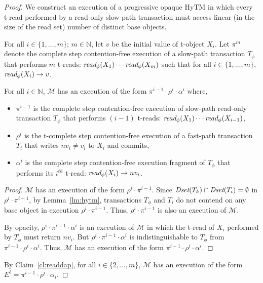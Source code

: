 %
\begin{proof}
We construct an execution of a progressive opaque HyTM in which every t-read performed by a read-only slow-path transaction
must access linear (in the size of the read set) number of distinct base objects.

For all $i\in \{1,\ldots , m\}$; $m \in \mathbb{N}$, let 
$v$ be the initial value of t-object $X_i$.
Let $\pi^{m}$ denote the complete step contention-free execution of a slow-path transaction
$T_{\phi}$ that performs ${m}$ t-reads: $\textit{read}_{\phi}(X_1)\cdots \textit{read}_{\phi}(X_{m})$
such that for all $i\in \{1,\ldots , m \}$, $\textit{read}_{\phi}(X_i) \rightarrow v$.
%
\begin{claim}
\label{cl:readdap}
For all $i\in \mathbb{N}$, $\mathcal{M}$ has an execution of the form $\pi^{i-1}\cdot \rho^i\cdot \alpha^i$ where,
%
\begin{itemize}
\item
$\pi^{i-1}$ is the complete step contention-free execution of slow-path read-only transaction $T_{\phi}$ that performs
$(i-1)$ t-reads: $\textit{read}_{\phi}(X_1)\cdots \textit{read}_{\phi}(X_{i-1})$,
\item
$\rho^i$ is the t-complete step contention-free execution of a fast-path transaction $T_{i}$
that writes $nv_i\neq v_i$ to $X_i$ and commits,
\item
$\alpha^i$ is the complete step contention-free execution fragment of $T_{\phi}$ that performs its $i^{th}$ t-read:
$\textit{read}_{\phi}(X_i) \rightarrow nv_i$.
\end{itemize}
%
\end{claim}
%
\begin{proof}
%
$\mathcal{M}$ has an execution of the form $\rho^i\cdot \pi^{i-1}$.
Since $\textit{Dset}(T_k) \cap \textit{Dset}(T_{i}) =\emptyset$ in $\rho^i\cdot \pi^{i-1}$,
by Lemma~\ref{lm:hytm}, transactions $T_{\phi}$ and $T_i$ do not contend
on any base object in execution $\rho^i\cdot \pi^{i-1}$.
Thus, $\rho^i\cdot \pi^{i-1}$ is also an execution of $\mathcal{M}$.

By opacity, $\rho^i\cdot \pi^{i-1} \cdot \alpha^i$ is an execution
of $\mathcal{M}$ in which the t-read of $X_i$ performed by $T_{\phi}$ must return $nv_i$.
But $\rho^i \cdot \pi^{i-1} \cdot \alpha^i$ is indistinguishable to $T_{\phi}$ from
$\pi^{i-1}\cdot \rho^i \cdot \alpha^i$.
Thus, $\mathcal{M}$ has an execution of the form $\pi^{i-1}\cdot \rho^i \cdot \alpha^i$.
\end{proof}
%
By Claim~\ref{cl:readdap}, for all $i\in \{2,\ldots, m\}$, $\mathcal{M}$ has an execution of the form 
$E^{i}=\pi^{i-1}\cdot \rho^i \cdot \alpha_i$.


\end{proof}
